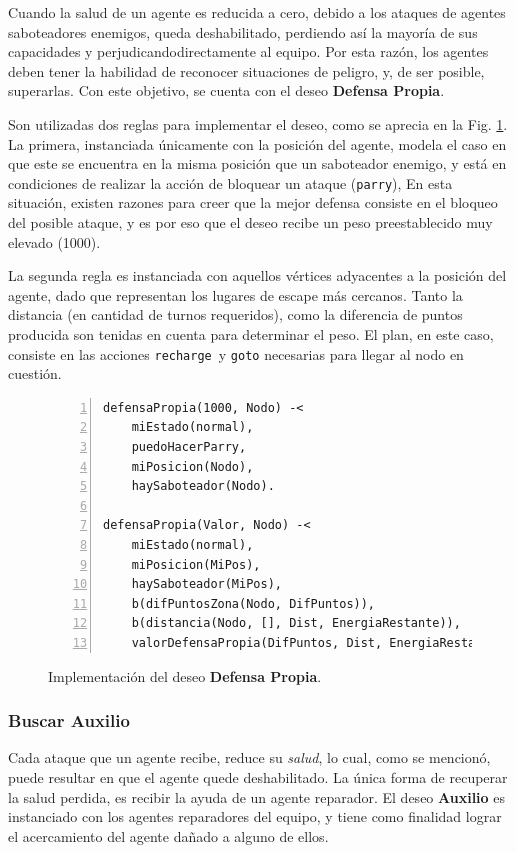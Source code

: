 \documentclass[oneside]{book}
\theoremstyle{definition}
\begin{document}
Cuando la salud de un agente es reducida a cero, debido a los ataques de 
agentes saboteadores enemigos, queda deshabilitado, perdiendo así la mayoría 
de sus capacidades y perjudicandodirectamente al equipo. Por esta razón, los 
agentes deben tener la habilidad de reconocer situaciones de peligro, y, de 
ser posible, superarlas. Con este objetivo, se cuenta con el deseo 
\textbf{Defensa Propia}.

Son utilizadas dos reglas para implementar el deseo, como se aprecia en la Fig. 
\ref{fig:deseoDefensaPropia}.
La primera, instanciada únicamente con la posición del agente, modela el caso en que este se 
encuentra en la misma posición que un saboteador enemigo, y está en condiciones de realizar 
la acción de bloquear un ataque (\texttt{parry}), En esta situación, existen razones para 
creer que la mejor defensa consiste en el bloqueo del posible ataque, y es por eso que el 
deseo recibe un peso preestablecido muy elevado (1000). 

La segunda regla es instanciada con aquellos vértices adyacentes a la posición del agente,
dado que representan los lugares de escape más cercanos. Tanto la distancia (en cantidad de 
turnos requeridos), como la diferencia de puntos producida son tenidas en cuenta para 
determinar el peso. El plan, en este caso, consiste en las acciones \texttt{recharge}\ y 
\texttt{goto} necesarias para llegar al nodo en cuestión.

\begin{figure}[h]
\begin{Verbatim}[numbers=left]
defensaPropia(1000, Nodo) -<
    miEstado(normal),    
    puedoHacerParry,
    miPosicion(Nodo),
    haySaboteador(Nodo).

defensaPropia(Valor, Nodo) -<
    miEstado(normal),    
    miPosicion(MiPos),    
    haySaboteador(MiPos),
    b(difPuntosZona(Nodo, DifPuntos)),
    b(distancia(Nodo, [], Dist, EnergiaRestante)),
    valorDefensaPropia(DifPuntos, Dist, EnergiaRestante, Valor).
\end{Verbatim}
\caption{Implementación del deseo \textbf{Defensa Propia}.}
\label{fig:deseoDefensaPropia}
\end{figure}
	
\subsubsection{Buscar Auxilio}
	
Cada ataque que un agente recibe, reduce su \textit{salud}, lo cual, como se mencionó, 
puede resultar en que el agente quede deshabilitado. La única forma de recuperar la 
salud perdida, es recibir la ayuda de un agente reparador. El deseo \textbf{Auxilio} 
es instanciado con los agentes reparadores del equipo, y tiene como finalidad lograr 
el acercamiento del agente dañado a alguno de ellos.
\end{document}
